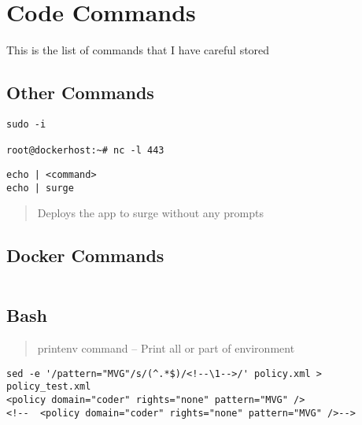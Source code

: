 \section{Code Commands}\label{code-commands}

This is the list of commands that I have careful stored

\subsection{Other Commands}\label{other-commands}

\begin{Shaded}
\end{Shaded}

\begin{verbatim}
sudo -i

root@dockerhost:~# nc -l 443
\end{verbatim}

\begin{verbatim}
echo | <command>
echo | surge
\end{verbatim}

\begin{quote}
Deploys the app to surge without any prompts
\end{quote}

\hypertarget{docker-commands}{%
\subsection{Docker Commands}\label{docker-commands}}

\begin{verbatim}
\end{verbatim}

\hypertarget{bash}{%
\subsection{Bash}\label{bash}}

\begin{quote}
printenv command -- Print all or part of environment
\end{quote}

\begin{verbatim}
sed -e '/pattern="MVG"/s/(^.*$)/<!--\1-->/' policy.xml > policy_test.xml
<policy domain="coder" rights="none" pattern="MVG" />
<!--  <policy domain="coder" rights="none" pattern="MVG" />-->
\end{verbatim}


